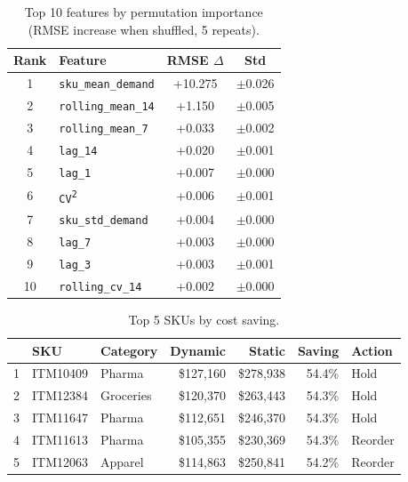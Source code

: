 \documentclass[11pt,letterpaper]{article}
\begin{document}
\begin{table}[H]
\centering
\caption{Top 10 features by permutation importance (RMSE increase when shuffled, 5 repeats).}
\label{tab:perm-importance}
\small
\begin{tabular}{@{}clcc@{}}
\toprule
\textbf{Rank} & \textbf{Feature} & \textbf{RMSE $\Delta$} & \textbf{Std} \\
\midrule
1  & \texttt{sku\_mean\_demand}  & +10.275 & $\pm$0.026 \\
2  & \texttt{rolling\_mean\_14}  & +1.150  & $\pm$0.005 \\
3  & \texttt{rolling\_mean\_7}   & +0.033  & $\pm$0.002 \\
4  & \texttt{lag\_14}            & +0.020  & $\pm$0.001 \\
5  & \texttt{lag\_1}             & +0.007  & $\pm$0.000 \\
6  & \texttt{CV\textsuperscript{2}} & +0.006 & $\pm$0.001 \\
7  & \texttt{sku\_std\_demand}   & +0.004  & $\pm$0.000 \\
8  & \texttt{lag\_7}             & +0.003  & $\pm$0.000 \\
9  & \texttt{lag\_3}             & +0.003  & $\pm$0.001 \\
10 & \texttt{rolling\_cv\_14}    & +0.002  & $\pm$0.000 \\
\bottomrule
\end{tabular}
\end{table}

\begin{table}[H]
\centering
\caption{Top 5 SKUs by cost saving.}
\label{tab:top5}
\small
\begin{tabular}{@{}cllrrrl@{}}
\toprule
 & \textbf{SKU} & \textbf{Category} & \textbf{Dynamic} & \textbf{Static} & \textbf{Saving} & \textbf{Action} \\
\midrule
1 & ITM10409 & Pharma    & \$127,160 & \$278,938 & 54.4\% & Hold \\
2 & ITM12384 & Groceries & \$120,370 & \$263,443 & 54.3\% & Hold \\
3 & ITM11647 & Pharma    & \$112,651 & \$246,370 & 54.3\% & Hold \\
4 & ITM11613 & Pharma    & \$105,355 & \$230,369 & 54.3\% & Reorder \\
5 & ITM12063 & Apparel   & \$114,863 & \$250,841 & 54.2\% & Reorder \\
\bottomrule
\end{tabular}
\end{table}
\end{document}
